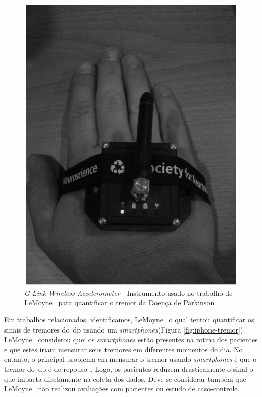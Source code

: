 \begin{figure}
 \centering
 \includegraphics[scale=0.3]{./img/quantif-parkinson.png}
\caption[\textit{G-Link Wireless Accelerometer} - Instrumento usado no trabalho de LeMoyne para quantificar o tremor da Doença de Parkinson]{\textit{G-Link Wireless Accelerometer} - Instrumento usado no trabalho de LeMoyne~\cite{LeMoyne2009} para quantificar o tremor da Doença de Parkinson} 
 \label{fig:quantif-parkinson}
\end{figure}


Em trabalhos relacionados, identificamos, LeMoyne~\cite{lemoyne2010} o qual tentou quantificar os sinais de tremores do~\ac{dp} usando um \textit{smartphones}(Figura \ref{fig:iphone-tremor}). LeMoyne~\cite{lemoyne2010} considerou que: os \textit{smartphones} estão presentes na rotina dos pacientes e que estes iriam mensurar seus tremores em diferentes momentos do dia. No entanto, o principal problema em mensurar o tremor usando \textit{smartphones} é que o tremor do~\ac{dp} é de repouso~\cite{jankovic2008}. Logo, os pacientes reduzem drasticamente o sinal o que impacta diretamente na coleta dos dados. Deve-se considerar também que LeMoyne~\cite{lemoyne2010} não realizou avaliações com pacientes ou estudo de caso-controle.




